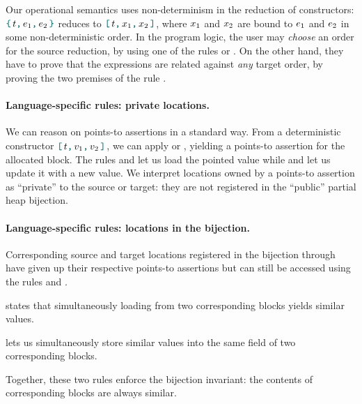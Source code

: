 Our operational semantics uses non-determinism in the reduction of constructors: $\datalangBlock{\datalangTag}{\datalangExpr_1}{\datalangExpr_2}$ reduces to $\datalangBlockDet{\datalangTag}{\datalangVar_1}{\datalangVar_2}$, where $\datalangVar_1$ and $\datalangVar_2$ are bound to $\datalangExpr_1$ and $\datalangExpr_2$ in some non-deterministic order.
In the program logic, the user may \emph{choose} an order for the source reduction, by using one of the rules  or . On the other hand, they have to prove that the expressions are related against \emph{any} target order, by proving the two premises of the rule .

\paragraph{Language-specific rules: private locations.}
We can reason on points-to assertions in a standard way.
From a deterministic constructor $\datalangBlockDet{\datalangTag}{\datalangVal_1}{\datalangVal_2}$, we can apply  or , yielding a points-to assertion for the allocated block.
The rules  and  let us load the pointed value while  and  let us update it with a new value.
We interpret locations owned by a points-to assertion as ``private'' to the source or target: they are not registered in the ``public'' partial heap bijection.

\paragraph{Language-specific rules: locations in the bijection.}
Corresponding source and target locations registered in the bijection through  have given up their respective points-to assertions but can still be accessed using the rules  and .

 states that simultaneously loading from two corresponding blocks yields similar values.

 lets us simultaneously store similar values into the same field of two corresponding blocks.

Together, these two rules enforce the bijection invariant: the contents of corresponding blocks are always similar.

